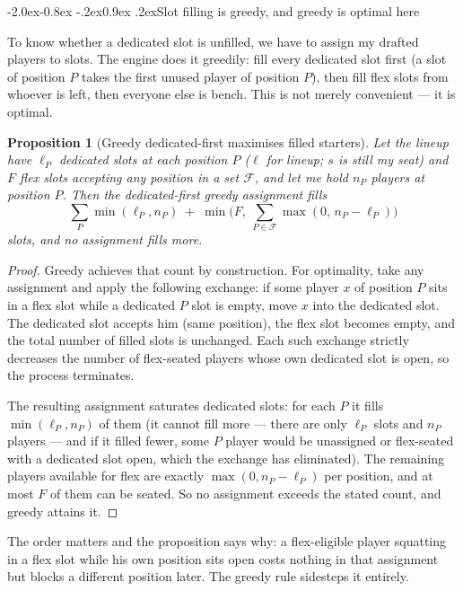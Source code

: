 \documentclass[10pt,a4paper]{article}
\makeatletter
\theoremstyle{plain}
\newtheorem{proposition}[theorem]{Proposition}
\theoremstyle{definition}
\theoremstyle{remark}
\renewcommand\subsection{\@startsection{subsection}{2}{\z@}%
  {-2.0ex\@plus -0.8ex \@minus -.2ex}{0.9ex \@plus .2ex}{\normalfont\large\bfseries}}
\makeatother
\begin{document}
\subsection{Slot filling is greedy, and greedy is optimal here}

To know whether a dedicated slot is unfilled, we have to assign my drafted players to
slots. The engine does it greedily: fill every dedicated slot first (a slot of position
$P$ takes the first unused player of position $P$), then fill flex slots from whoever is
left, then everyone else is bench. This is not merely convenient --- it is optimal.

\begin{proposition}[Greedy dedicated-first maximises filled starters]
\label{prop:greedy}
Let the lineup have $\ell_P$ dedicated slots at each position $P$ ($\ell$ for lineup; $s$
is still my seat) and $F$ flex slots accepting any position in a set $\mathcal{F}$, and
let me hold $n_P$ players at position $P$. Then the dedicated-first greedy assignment
fills
\[
\sum_P \min(\ell_P, n_P) \;+\; \min\Big(F,\ \textstyle\sum_{P\in\mathcal{F}} \max(0,\, n_P - \ell_P)\Big)
\]
slots, and no assignment fills more.
\end{proposition}

\begin{proof}
Greedy achieves that count by construction. For optimality, take any assignment and
apply the following exchange: if some player $x$ of position $P$ sits in a flex slot
while a dedicated $P$ slot is empty, move $x$ into the dedicated slot. The dedicated
slot accepts him (same position), the flex slot becomes empty, and the total number of
filled slots is unchanged. Each such exchange strictly decreases the number of
flex-seated players whose own dedicated slot is open, so the process terminates.

The resulting assignment saturates dedicated slots: for each $P$ it fills
$\min(\ell_P, n_P)$ of them (it cannot fill more --- there are only $\ell_P$ slots and
$n_P$ players --- and if it filled fewer, some $P$ player would be unassigned or
flex-seated with a dedicated slot open, which the exchange has eliminated). The remaining
players available for flex are exactly $\max(0, n_P - \ell_P)$ per position, and at most $F$ of
them can be seated. So no assignment exceeds the stated count, and greedy attains it.
\end{proof}

The order matters and the proposition says why: a flex-eligible player squatting in a
flex slot while his own position sits open costs nothing in that assignment but blocks a
different position later. The greedy rule sidesteps it entirely.
\end{document}
